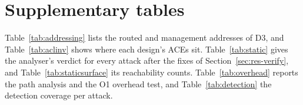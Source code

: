 \appendices
\section{Supplementary tables}
\label{app:tables}
Table~\ref{tab:addressing} lists the routed and management addresses of D3, and Table~\ref{tab:aclinv} shows where each design's ACEs sit. \ifhavestatic Table~\ref{tab:static} gives the analyser's verdict for every attack after the fixes of Section~\ref{sec:res-verify}, and Table~\ref{tab:staticsurface} its reachability counts. \fi Table~\ref{tab:overhead} reports the path analysis and the O1 overhead test\ifhavedetection, and Table~\ref{tab:detection} the detection coverage per attack\fi.



\ifhavestatic\fi

\ifhavedetection\fi
